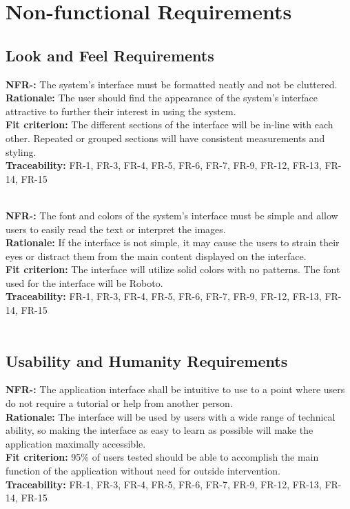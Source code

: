 \documentclass[12pt, titlepage]{article}
\newcounter{NFR_Counter}
\newcounter{FR_Counter}
\begin{document}
\section{Non-functional Requirements}

\subsection{Look and Feel Requirements}

\textbf{NFR-\the\value{NFR_Counter}:}
The system's interface must be formatted neatly and not be cluttered. \\
\textbf{Rationale:}
The user should find the appearance of the system's interface attractive to further their interest in using the system. \\
\textbf{Fit criterion:}
The different sections of the interface will be in-line with each other. Repeated or grouped sections will have consistent measurements and styling. \\
\textbf{Traceability:}
FR-1, FR-3, FR-4, FR-5, FR-6, FR-7, FR-9, FR-12, FR-13, FR-14, FR-15 \\~\\
\addtocounter{NFR_Counter}{1}

\noindent\textbf{NFR-\the\value{NFR_Counter}:}
The font and colors of the system's interface must be simple and allow users to easily read the text or interpret the images. \\
\textbf{Rationale:}
If the interface is not simple, it may cause the users to strain their eyes or distract them from the main content displayed on the interface. \\
\textbf{Fit criterion:}
The interface will utilize solid colors with no patterns. The font used for the interface will be Roboto. \\
\textbf{Traceability:}
FR-1, FR-3, FR-4, FR-5, FR-6, FR-7, FR-9, FR-12, FR-13, FR-14, FR-15 \\~\\
\addtocounter{NFR_Counter}{1}

\subsection{Usability and Humanity Requirements}

\textbf{NFR-\the\value{NFR_Counter}:}
The application interface shall be intuitive to use to a point where users do not require a tutorial or help from another person. \\
\textbf{Rationale:}
The interface will be used by users with a wide range of technical ability, so making the interface as easy to learn as possible will make the application maximally accessible. \\
\textbf{Fit criterion:}
95\% of users tested should be able to accomplish the main function of the application without need for outside intervention. \\
\textbf{Traceability:}
FR-1, FR-3, FR-4, FR-5, FR-6, FR-7, FR-9, FR-12, FR-13, FR-14, FR-15 \\~\\
\addtocounter{NFR_Counter}{1}
\end{document}
